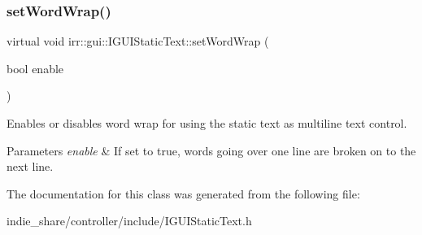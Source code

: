 \subsubsection{\texorpdfstring{set\+Word\+Wrap()}{setWordWrap()}\hspace{0.1cm}{\footnotesize\ttfamily [2/2]}}
{\footnotesize\ttfamily virtual void irr\+::gui\+::\+I\+G\+U\+I\+Static\+Text\+::set\+Word\+Wrap (\begin{DoxyParamCaption}\item[{bool}]{enable }\end{DoxyParamCaption})\hspace{0.3cm}{\ttfamily [pure virtual]}}



Enables or disables word wrap for using the static text as multiline text control. 


\begin{DoxyParams}{Parameters}
{\em enable} & If set to true, words going over one line are broken on to the next line. \\
\hline
\end{DoxyParams}


The documentation for this class was generated from the following file\+:\begin{DoxyCompactItemize}
\item 
indie\+\_\+share/controller/include/I\+G\+U\+I\+Static\+Text.\+h\end{DoxyCompactItemize}
